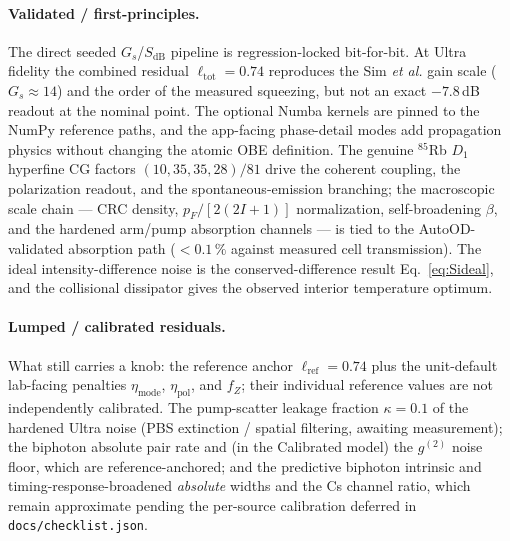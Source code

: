 \documentclass[11pt]{article}
\newcommand{\code}[1]{\texttt{#1}}
\begin{document}
\paragraph{Validated / first-principles.} The direct seeded
$G_s$/$S_{\text{dB}}$ pipeline is regression-locked bit-for-bit. At Ultra
fidelity the combined residual $\ell_{\text{tot}}=0.74$ reproduces the Sim \emph{et al.}
gain scale ($G_s\approx14$) and the order of the measured squeezing, but not an
exact $-7.8\,$dB readout at the nominal point. The
optional Numba kernels are pinned to the NumPy reference paths, and the
app-facing phase-detail modes add propagation physics without changing the
atomic OBE definition. The genuine $^{85}$Rb $D_1$ hyperfine CG factors
$(10,35,35,28)/81$ drive the coherent coupling, the polarization readout, and
the spontaneous-emission branching; the macroscopic scale chain --- CRC density,
$p_F/[2(2I+1)]$ normalization, self-broadening $\beta$, and the hardened
arm/pump absorption channels --- is tied to the AutoOD-validated absorption path
($<0.1\,\%$ against measured cell transmission). The ideal
intensity-difference noise is the conserved-difference result
Eq.~\eqref{eq:Sideal}, and the collisional dissipator gives the observed
interior temperature optimum.

\paragraph{Lumped / calibrated residuals.} What still carries a knob: the
reference anchor $\ell_{\text{ref}}=0.74$ plus the unit-default lab-facing
penalties $\eta_{\text{mode}}$, $\eta_{\text{pol}}$, and $f_Z$; their individual
reference values are not independently calibrated. The pump-scatter leakage fraction
$\kappa=0.1$ of the hardened Ultra noise (PBS extinction / spatial filtering,
awaiting measurement); the biphoton absolute pair rate and (in the Calibrated
model) the $g^{(2)}$ noise floor, which are reference-anchored; and the
predictive biphoton intrinsic and timing-response-broadened \emph{absolute}
widths and the Cs channel ratio, which remain approximate pending the per-source
calibration deferred in
\code{docs/checklist.json}.
\end{document}
